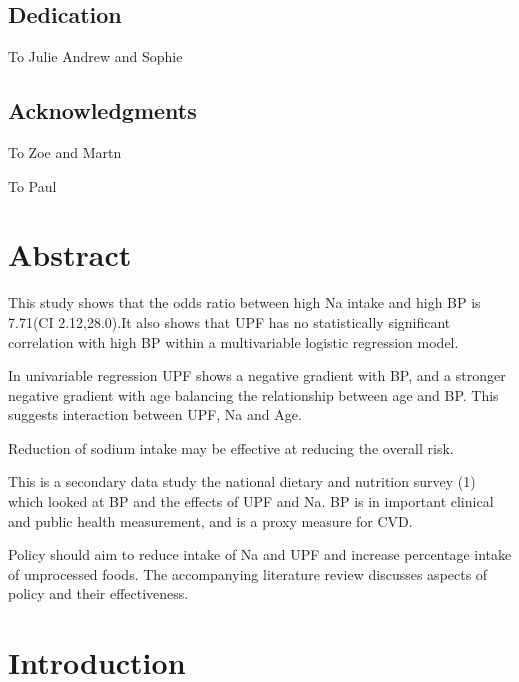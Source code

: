 \documentclass[
]{article}
\begin{document}
\newpage

\hypertarget{dedication}{%
\subsection*{Dedication}\label{dedication}}

To Julie Andrew and Sophie

\newpage

\hypertarget{acknowledgments}{%
\subsection*{Acknowledgments}\label{acknowledgments}}

To Zoe and Martn

To Paul

\newpage

\newpage

\hypertarget{abstract}{%
\section*{Abstract}\label{abstract}}

This study shows that the odds ratio between high Na intake and high BP
is 7.71(CI 2.12,28.0).It also shows that UPF has no statistically
significant correlation with high BP within a multivariable logistic
regression model.

In univariable regression UPF shows a negative gradient with BP, and a
stronger negative gradient with age balancing the relationship between
age and BP. This suggests interaction between UPF, Na and Age.

Reduction of sodium intake may be effective at reducing the overall
risk.

This is a secondary data study the national dietary and nutrition survey
(1) which looked at BP and the effects of UPF and Na. BP is in important
clinical and public health measurement, and is a proxy measure for CVD.

Policy should aim to reduce intake of Na and UPF and increase percentage
intake of unprocessed foods. The accompanying literature review
discusses aspects of policy and their effectiveness.

\tableofcontents
\listoffigures
\listoftables
\newpage

\newpage

\hypertarget{introduction}{%
\section{Introduction}\label{introduction}}
\end{document}
